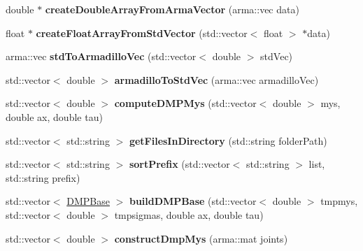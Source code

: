 \begin{DoxyCompactItemize}
\item 
\hypertarget{namespacekukadu_adb8d490dd8c2cccd6d17aeefbc678b58}{double $\ast$ {\bfseries create\-Double\-Array\-From\-Arma\-Vector} (arma\-::vec data)}\label{namespacekukadu_adb8d490dd8c2cccd6d17aeefbc678b58}

\item 
\hypertarget{namespacekukadu_a8e1c0f80941da1d7aa88815fc93d7c7e}{float $\ast$ {\bfseries create\-Float\-Array\-From\-Std\-Vector} (std\-::vector$<$ float $>$ $\ast$data)}\label{namespacekukadu_a8e1c0f80941da1d7aa88815fc93d7c7e}

\item 
\hypertarget{namespacekukadu_a62ccc34ae961950c370f6b4eb79eb43d}{arma\-::vec {\bfseries std\-To\-Armadillo\-Vec} (std\-::vector$<$ double $>$ std\-Vec)}\label{namespacekukadu_a62ccc34ae961950c370f6b4eb79eb43d}

\item 
\hypertarget{namespacekukadu_a045fd840a5811c4c12be38c5d44bdfaf}{std\-::vector$<$ double $>$ {\bfseries armadillo\-To\-Std\-Vec} (arma\-::vec armadillo\-Vec)}\label{namespacekukadu_a045fd840a5811c4c12be38c5d44bdfaf}

\item 
\hypertarget{namespacekukadu_a9d1317f4e5dcf564f7409eb6fc50af96}{std\-::vector$<$ double $>$ {\bfseries compute\-D\-M\-P\-Mys} (std\-::vector$<$ double $>$ mys, double ax, double tau)}\label{namespacekukadu_a9d1317f4e5dcf564f7409eb6fc50af96}

\item 
\hypertarget{namespacekukadu_a697f64d963479c2d3ba5c2a2a0cd510f}{std\-::vector$<$ std\-::string $>$ {\bfseries get\-Files\-In\-Directory} (std\-::string folder\-Path)}\label{namespacekukadu_a697f64d963479c2d3ba5c2a2a0cd510f}

\item 
\hypertarget{namespacekukadu_a6240d6b07b740be2461ce1e8b93b5f33}{std\-::vector$<$ std\-::string $>$ {\bfseries sort\-Prefix} (std\-::vector$<$ std\-::string $>$ list, std\-::string prefix)}\label{namespacekukadu_a6240d6b07b740be2461ce1e8b93b5f33}

\item 
\hypertarget{namespacekukadu_a579c6b9f3e0e71d5e90eb37df6dde59a}{std\-::vector$<$ \hyperlink{classkukadu_1_1DMPBase}{D\-M\-P\-Base} $>$ {\bfseries build\-D\-M\-P\-Base} (std\-::vector$<$ double $>$ tmpmys, std\-::vector$<$ double $>$ tmpsigmas, double ax, double tau)}\label{namespacekukadu_a579c6b9f3e0e71d5e90eb37df6dde59a}

\item 
\hypertarget{namespacekukadu_ac6a00fd5f5cdefd48a21fa31e11544be}{std\-::vector$<$ double $>$ {\bfseries construct\-Dmp\-Mys} (arma\-::mat joints)}\label{namespacekukadu_ac6a00fd5f5cdefd48a21fa31e11544be}

\end{DoxyCompactItemize}
